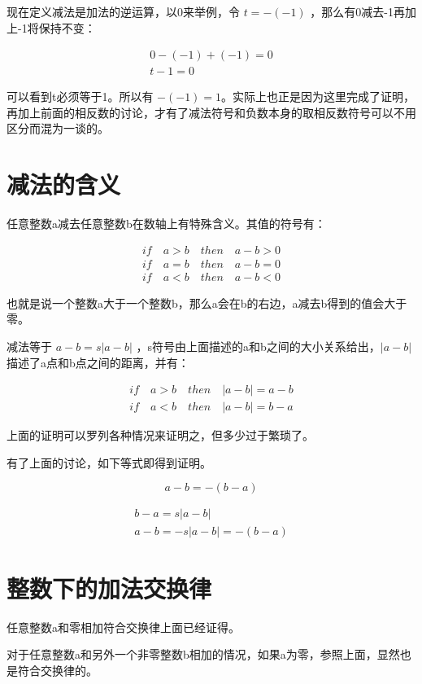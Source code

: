 \documentclass[12pt,oneside]{book}
\begin{document}
现在定义减法是加法的逆运算，以0来举例，令 $t=-(-1)$ ，那么有0减去-1再加上-1将保持不变：

\begin{align*}
0-(-1)+(-1)=0\\
t-1=0
\end{align*}

可以看到t必须等于1。所以有 $-(-1) = 1$。实际上也正是因为这里完成了证明，再加上前面的相反数的讨论，才有了减法符号和负数本身的取相反数符号可以不用区分而混为一谈的。

\section{减法的含义}
任意整数a减去任意整数b在数轴上有特殊含义。其值的符号有：

\begin{align*}
if \quad a>b \quad then \quad a-b>0\\
if \quad a=b \quad then \quad a-b=0\\
if \quad a<b \quad then \quad a-b<0
\end{align*}

也就是说一个整数a大于一个整数b，那么a会在b的右边，a减去b得到的值会大于零。

减法等于 $a-b = s|a-b|$ ，s符号由上面描述的a和b之间的大小关系给出，$|a-b|$描述了a点和b点之间的距离，并有：

\begin{align*}
if \quad a>b \quad then \quad |a-b| = a-b\\
if \quad a<b \quad then \quad |a-b| = b-a
\end{align*}

上面的证明可以罗列各种情况来证明之，但多少过于繁琐了。

有了上面的讨论，如下等式即得到证明。

\begin{equation}
\label{eq:3.8}
a - b = -(b-a)
\end{equation}

\begin{align*}
b-a = s|a-b| \\
a-b = -s|a-b| = -(b-a)
\end{align*}


\section{整数下的加法交换律}
任意整数a和零相加符合交换律上面已经证得。

对于任意整数a和另外一个非零整数b相加的情况，如果a为零，参照上面，显然也是符合交换律的。
\end{document}
